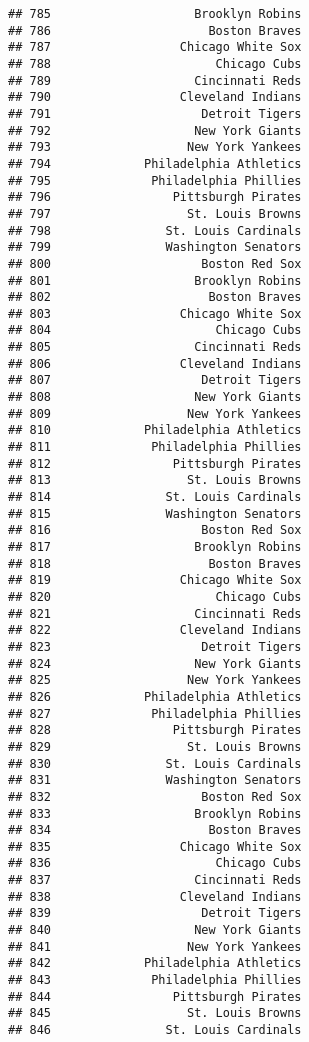 \documentclass[]{article}
\begin{document}
\begin{verbatim}
## 785                    Brooklyn Robins
## 786                      Boston Braves
## 787                  Chicago White Sox
## 788                       Chicago Cubs
## 789                    Cincinnati Reds
## 790                  Cleveland Indians
## 791                     Detroit Tigers
## 792                    New York Giants
## 793                   New York Yankees
## 794             Philadelphia Athletics
## 795              Philadelphia Phillies
## 796                 Pittsburgh Pirates
## 797                   St. Louis Browns
## 798                St. Louis Cardinals
## 799                Washington Senators
## 800                     Boston Red Sox
## 801                    Brooklyn Robins
## 802                      Boston Braves
## 803                  Chicago White Sox
## 804                       Chicago Cubs
## 805                    Cincinnati Reds
## 806                  Cleveland Indians
## 807                     Detroit Tigers
## 808                    New York Giants
## 809                   New York Yankees
## 810             Philadelphia Athletics
## 811              Philadelphia Phillies
## 812                 Pittsburgh Pirates
## 813                   St. Louis Browns
## 814                St. Louis Cardinals
## 815                Washington Senators
## 816                     Boston Red Sox
## 817                    Brooklyn Robins
## 818                      Boston Braves
## 819                  Chicago White Sox
## 820                       Chicago Cubs
## 821                    Cincinnati Reds
## 822                  Cleveland Indians
## 823                     Detroit Tigers
## 824                    New York Giants
## 825                   New York Yankees
## 826             Philadelphia Athletics
## 827              Philadelphia Phillies
## 828                 Pittsburgh Pirates
## 829                   St. Louis Browns
## 830                St. Louis Cardinals
## 831                Washington Senators
## 832                     Boston Red Sox
## 833                    Brooklyn Robins
## 834                      Boston Braves
## 835                  Chicago White Sox
## 836                       Chicago Cubs
## 837                    Cincinnati Reds
## 838                  Cleveland Indians
## 839                     Detroit Tigers
## 840                    New York Giants
## 841                   New York Yankees
## 842             Philadelphia Athletics
## 843              Philadelphia Phillies
## 844                 Pittsburgh Pirates
## 845                   St. Louis Browns
## 846                St. Louis Cardinals

\end{verbatim}
\end{document}
